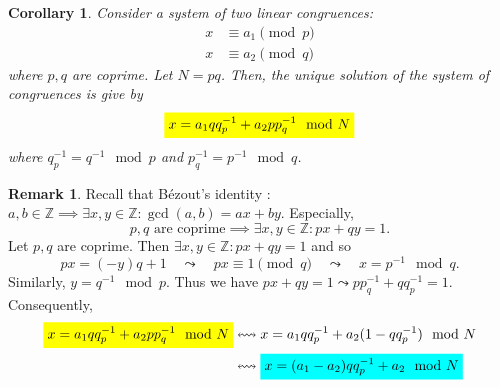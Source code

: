 \documentclass{article}
\newcommand{\mathcolorbox}[2]{\colorbox{#1}{$\displaystyle #2$}}
\newcommand{\inv}[1]{#1^{-1}}
\newtheorem*{theorem*}{Theorem}
\newtheorem*{corollary*}{Corollary}
\theoremstyle{definition}
\newtheorem*{remark}{Remark}
\begin{document}

	\begin{tcolorbox}[colback=white,colframe=corcolor,arc=5pt,title={\color{white}\bf $\mathsf{CRT}$ - Special Case}]
		\begin{corollary*}
			Consider a system of two linear congruences:
			\begin{align*}
			x&\equiv a_1 \pmod{p}\\
			x&\equiv a_2 \pmod{q}
			\end{align*} where $p,q$ are coprime. Let $N=pq$. Then, the unique solution of the system of congruences is give by \begin{align*}
			\mathcolorbox{-blue}{x=a_1qq_p^{-1}+a_2pp_q^{-1}\mod{N}}
			\end{align*} where $q_p^{-1}=\inv{q}\mod{p}$ and $p_{q}^{-1}=\inv{p}\mod{q}$.
		\end{corollary*}
	\end{tcolorbox}
	\begin{remark}
		Recall that Bézout's identity : $
		a,b\in\mathbb{Z}\implies\exists x,y\in\mathbb{Z}:\gcd(a,b)=ax+by.
		$ Especially, \[
		\text{$p,q$ are coprime}\implies\exists x,y\in\mathbb{Z}: px+qy=1.
		\] Let $p,q$ are coprime. Then $\exists x,y\in\mathbb{Z}:px+qy=1$ and so \[
		px=(-y)q+1\quad\leadsto\quad px\equiv1\pmod{q}\quad\leadsto\quad x=p^{-1}\mod{q}.
		\] Similarly, $y=q^{-1}\mod{p}$. Thus we have $px+qy=1\leadsto pp_{q}^{-1}+qq_{p}^{-1}=1$. Consequently, \begin{align*}
		\mathcolorbox{-blue}{x=a_1qq_p^{-1}+a_2pp_q^{-1}\mod{N}} &\leftrightsquigarrow x=a_1qq_p^{-1}+a_2(1-qq_{p}^{-1})\mod{N}\\
		&\leftrightsquigarrow \mathcolorbox{-red}{x=(a_1-a_2)qq_p^{-1}+a_2\mod{N}}\\
		\end{align*}
	\end{remark}
	
\end{document}
